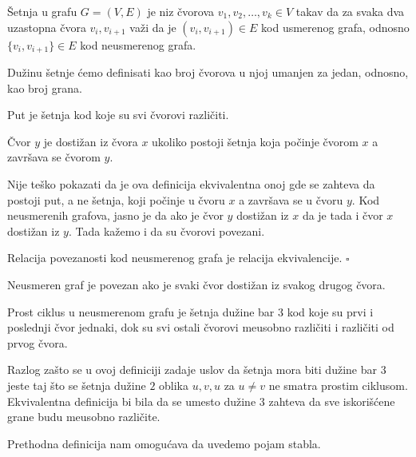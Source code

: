\begin{dfn}
\v Setnja u grafu $G=(V,E)$ je niz \v cvorova $v_1, v_2, \ldots, v_k \in V$ takav da za svaka dva uzastopna \v cvora $v_i, v_{i+1}$ va\v zi da je $(v_i, v_{i+1}) \in E$ kod usmerenog grafa, odnosno $\{v_i, v_{i+1}\} \in E$ kod neusmerenog grafa.
\end{dfn}

Du\v zinu \v setnje \' cemo definisati kao broj \v cvorova u njoj umanjen za jedan, odnosno, kao broj grana.

\begin{dfn}
Put je \v setnja kod koje su svi \v cvorovi razli\v citi.
\end{dfn}

\begin{dfn}
\v Cvor $y$ je dosti\v zan iz \v cvora $x$ ukoliko postoji \v setnja koja po\v cinje \v cvorom $x$ a zavr\v sava se \v cvorom $y$.
\end{dfn}

Nije te\v sko pokazati da je ova definicija ekvivalentna onoj gde se zahteva da postoji put, a ne \v setnja, koji po\v cinje u \v cvoru $x$ a zavr\v sava se u \v cvoru $y$. Kod neusmerenih grafova, jasno je da ako je \v cvor $y$ dosti\v zan iz $x$ da je tada i \v cvor $x$ dosti\v zan iz $y$. Tada ka\v zemo i da su \v cvorovi povezani. 

\begin{thm}
Relacija povezanosti kod neusmerenog grafa je relacija ekvivalencije. \hfill $\square$
\end{thm}

\begin{dfn}
Neusmeren graf je povezan ako je svaki \v cvor dosti\v zan iz svakog drugog \v cvora.
\end{dfn}

\begin{dfn}
Prost ciklus u neusmerenom grafu je \v setnja du\v zine bar $3$ kod koje su prvi i poslednji \v cvor jednaki, dok su svi ostali \v cvorovi me\dj usobno razli\v citi i razli\v citi od prvog \v cvora.
\end{dfn}

Razlog za\v sto se u ovoj definiciji zadaje uslov da \v setnja mora biti du\v zine bar $3$ jeste taj \v sto se \v setnja du\v zine $2$ oblika $u, v, u$ za $u\not = v$ ne smatra prostim ciklusom. Ekvivalentna definicija bi bila da se umesto du\v zine $3$ zahteva da sve iskori\v s\' cene grane budu me\dj usobno razli\v cite.

Prethodna definicija nam omogu\' cava da uvedemo pojam stabla.

